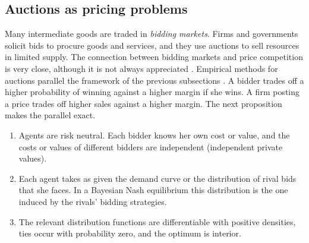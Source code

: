 \subsection{Auctions as pricing problems}\label{sec:01-today-auctions}

Many intermediate goods are traded in \emph{bidding markets}. Firms and governments solicit bids to procure
goods and services, and they use auctions to sell resources in limited supply. The connection between bidding
markets and price competition is very close, although it is not always appreciated
\citep[pp.~152--153]{EinavLevin2010}. Empirical methods for auctions parallel the framework of the previous
subsections \citep{AtheyHaile2006,HendricksPorter2007}. A bidder trades off a higher probability of winning
against a higher margin if she wins. A firm posting a price trades off higher sales against a higher margin.
The next proposition makes the parallel exact.

\begin{assumption}\label{ass:01-auction-basic}
\leavevmode
\begin{enumerate}[label=(\roman*)]
  \item Agents are risk neutral. Each bidder knows her own cost or value, and the costs or values of
        different bidders are independent (independent private values).
  \item Each agent takes as given the demand curve or the distribution of rival bids that she faces. In a
        Bayesian Nash equilibrium this distribution is the one induced by the rivals' bidding strategies.
  \item The relevant distribution functions are differentiable with positive densities, ties occur with
        probability zero, and the optimum is interior.
\end{enumerate}
\end{assumption}

